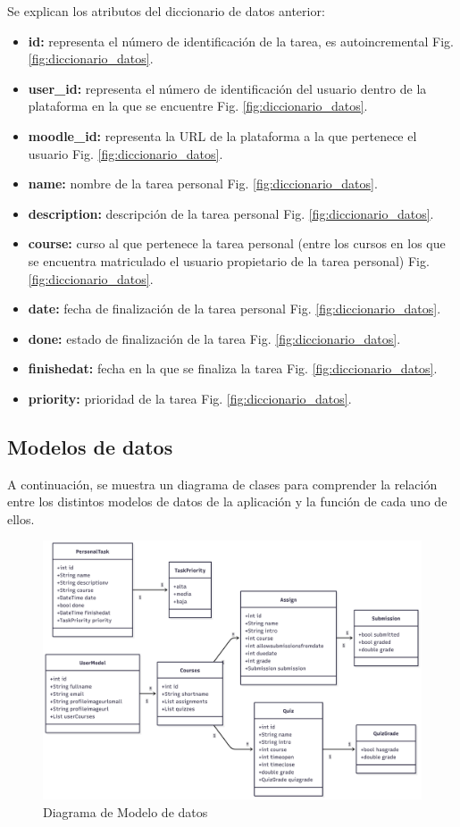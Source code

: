 Se explican los atributos del diccionario de datos anterior:
\begin{itemize}
    \item \textbf{id:} representa el número de identificación de la tarea, es autoincremental Fig. \ref{fig:diccionario_datos}.
    \item \textbf{user\_id:} representa el número de identificación del usuario dentro de la plataforma en la que se encuentre Fig. \ref{fig:diccionario_datos}.
    \item \textbf{moodle\_id:} representa la URL de la plataforma a la que pertenece el usuario Fig. \ref{fig:diccionario_datos}.
    \item \textbf{name:} nombre de la tarea personal Fig. \ref{fig:diccionario_datos}.
    \item \textbf{description:} descripción de la tarea personal Fig. \ref{fig:diccionario_datos}.
    \item \textbf{course:} curso al que pertenece la tarea personal (entre los cursos en los que se encuentra matriculado el usuario propietario de la tarea personal) Fig. \ref{fig:diccionario_datos}.
    \item \textbf{date:} fecha de finalización de la tarea personal Fig. \ref{fig:diccionario_datos}.
    \item \textbf{done:} estado de finalización de la tarea Fig. \ref{fig:diccionario_datos}.
    \item \textbf{finishedat:} fecha en la que se finaliza la tarea Fig. \ref{fig:diccionario_datos}.
    \item \textbf{priority:} prioridad de la tarea Fig. \ref{fig:diccionario_datos}.
\end{itemize}

\subsection{Modelos de datos}
A continuación, se muestra un diagrama de clases para comprender la relación entre los distintos modelos de datos de la aplicación y la función de cada uno de ellos.

\begin{figure}[H]
    \centering
    \includegraphics[width=1.0\linewidth]{img/modelo_datos.png}
    \caption{Diagrama de Modelo de datos}
    \label{fig:modelo_datos}
\end{figure}

